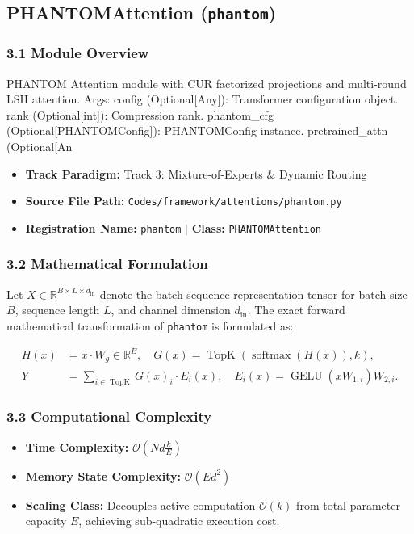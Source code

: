 \subsection{PHANTOMAttention (\texttt{phantom})}
\label{sec:app_module_phantom}

\subsubsection*{3.1 Module Overview}
PHANTOM Attention module with CUR factorized projections and multi-round LSH attention.  Args:     config (Optional[Any]): Transformer configuration object.     rank (Optional[int]): Compression rank.     phantom\_cfg (Optional[PHANTOMConfig]): PHANTOMConfig instance.     pretrained\_attn (Optional[An
\begin{itemize}
    \item \textbf{Track Paradigm:} Track 3: Mixture-of-Experts & Dynamic Routing
    \item \textbf{Source File Path:} \texttt{Codes/framework/attentions/phantom.py}
    \item \textbf{Registration Name:} \texttt{phantom} $\mid$ \textbf{Class:} \texttt{PHANTOMAttention}
\end{itemize}

\subsubsection*{3.2 Mathematical Formulation}
Let $X \in \mathbb{R}^{B \times L \times d_{\text{in}}}$ denote the batch sequence representation tensor for batch size $B$, sequence length $L$, and channel dimension $d_{\text{in}}$. The exact forward mathematical transformation of \texttt{phantom} is formulated as:

\begin{align}
H(x) &= x \cdot W_g \in \mathbb{R}^{E}, \quad G(x) = \operatorname{TopK}\left(\operatorname{softmax}(H(x)), k\right), \\
Y &= \sum_{i \in \operatorname{TopK}} G(x)_i \cdot E_i(x), \quad E_i(x) = \operatorname{GELU}(x W_{1, i}) W_{2, i}.
\end{align}


\subsubsection*{3.3 Computational Complexity}
\begin{itemize}
    \item \textbf{Time Complexity:} $\mathcal{O}(N d \frac{k}{E})$
    \item \textbf{Memory State Complexity:} $\mathcal{O}(E d^2)$
    \item \textbf{Scaling Class:} Decouples active computation $\mathcal{O}(k)$ from total parameter capacity $E$, achieving sub-quadratic execution cost.
\end{itemize}

